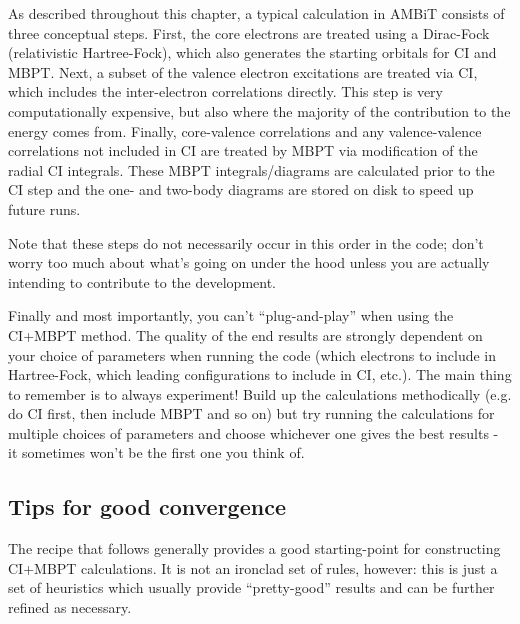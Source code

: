 \documentclass{report}
\begin{document}
As described throughout this chapter, a typical calculation in AMBiT consists of three conceptual steps.
First, the core electrons are treated using a Dirac-Fock (relativistic
Hartree-Fock), which also generates the starting orbitals for CI and
MBPT. Next, a subset of the valence electron excitations are treated via
CI, which includes the inter-electron correlations directly. This step
is very computationally expensive, but also where the majority of the
contribution to the energy comes from. Finally, core-valence
correlations and any valence-valence correlations not included in CI are
treated by MBPT via modification of the radial CI integrals. These MBPT
integrals/diagrams are calculated prior to the CI step and the one- and
two-body diagrams are stored on disk to speed up future runs.

Note that these steps do not necessarily occur in this order in
the code; don't worry too much about what's going on under the hood
unless you are actually intending to contribute to the development.

Finally and most importantly, you can't ``plug-and-play'' when using the CI+MBPT method. The quality of 
the end results are strongly
dependent on your choice of parameters when running the code (which
electrons to include in Hartree-Fock, which leading configurations to
include in CI, etc.). The main thing to remember is to always
experiment! Build up the calculations methodically (e.g. do CI first,
then include MBPT and so on) but try running the calculations for
multiple choices of parameters and choose whichever one gives the best
results - it sometimes won't be the first one you think of.

\subsection{Tips for good convergence}

The recipe that follows generally provides a good starting-point for constructing CI+MBPT calculations.
It is not an ironclad set of rules, however: this is just a set of heuristics which usually provide
``pretty-good'' results and can be further refined as necessary. 
\end{document}
